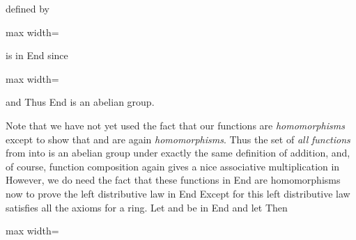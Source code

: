 \documentclass[11pt,oneside]{article}
\begin{document}
\begin{BookBody}
\noindent \BookInline{- \phi } defined by

\begin{center}\begin{adjustbox}{max width=\linewidth}\end{adjustbox}\end{center}

\noindent is in End since

\begin{center}\begin{adjustbox}{max width=\linewidth}\end{adjustbox}\end{center}

\noindent and  Thus \BookInline{\langle }End is an abelian group.

Note that we have not yet used the fact that our functions are\textit{ homomorphisms} except to show that \BookInline{\phi + \psi } and \BookInline{- \phi } are again\textit{ homomorphisms}. Thus the set  of\textit{ all} \textit{functions} from  into  is an abelian group under exactly the same definition of addition, and, of course, function composition again gives a nice associative multiplication in  However, we do need the fact that these functions in End are homomorphisms now to prove the left distributive law in End Except for this left distributive law satisfies all the axioms for a ring. Let \BookInline{\phi,\allowbreak \psi,\allowbreak } and \BookInline{\theta } be in End and let  Then

\begin{center}\begin{adjustbox}{max width=\linewidth}\end{adjustbox}\end{center}


\end{BookBody}
\end{document}

